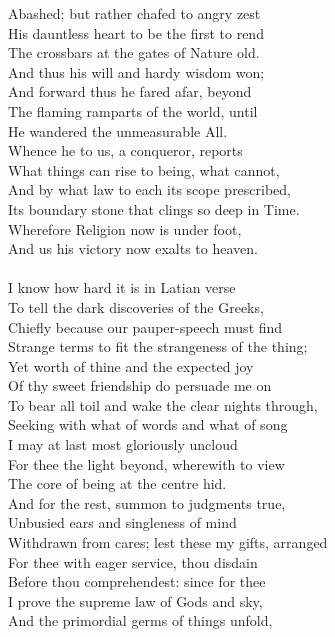 Abashed; but rather chafed to angry zest\\
His dauntless heart to be the first to rend\\
The crossbars at the gates of Nature old.\\
And thus his will and hardy wisdom won;\\
And forward thus he fared afar, beyond\\
The flaming ramparts of the world, until\\
He wandered the unmeasurable All.\\
Whence he to us, a conqueror, reports\\
What things can rise to being, what cannot,\\
And by what law to each its scope prescribed,\\
Its boundary stone that clings so deep in Time.\\
Wherefore Religion now is under foot,\\
And us his victory now exalts to heaven.\\
\\
I know how hard it is in Latian verse\\
To tell the dark discoveries of the Greeks,\\
Chiefly because our pauper-speech must find\\
Strange terms to fit the strangeness of the thing;\\
Yet worth of thine and the expected joy\\
Of thy sweet friendship do persuade me on\\
To bear all toil and wake the clear nights through,\\
Seeking with what of words and what of song\\
I may at last most gloriously uncloud\\
For thee the light beyond, wherewith to view\\
The core of being at the centre hid.\\
And for the rest, summon to judgments true,\\
Unbusied ears and singleness of mind\\
Withdrawn from cares; lest these my gifts, arranged\\
For thee with eager service, thou disdain\\
Before thou comprehendest: since for thee\\
I prove the supreme law of Gods and sky,\\
And the primordial germs of things unfold,\\
